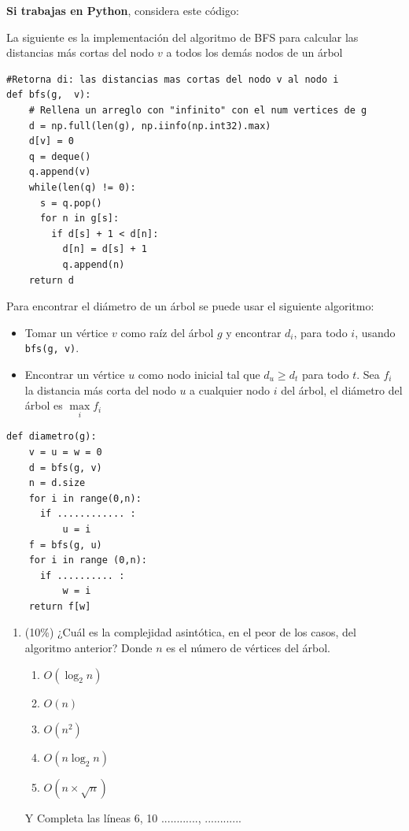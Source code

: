 \documentclass[10 pt]{article}
\begin{document}
\newpage



\textbf{Si trabajas en Python}, considera este código:

\hspace{1cm}

La siguiente es la implementación del algoritmo de BFS para calcular las
  distancias más cortas del nodo $v$ a todos los demás nodos de un árbol
  {\footnotesize
  \begin{lstlisting}
#Retorna di: las distancias mas cortas del nodo v al nodo i
def bfs(g,  v):
    # Rellena un arreglo con "infinito" con el num vertices de g
    d = np.full(len(g), np.iinfo(np.int32).max)
    d[v] = 0
    q = deque()
    q.append(v)
    while(len(q) != 0):
      s = q.pop()
      for n in g[s]:        
        if d[s] + 1 < d[n]:
          d[n] = d[s] + 1
          q.append(n)
    return d
  \end{lstlisting}
  }

  Para encontrar el diámetro de un árbol se puede usar el siguiente algoritmo:
  \begin{itemize}[noitemsep]
    \item Tomar un vértice $v$ como raíz del árbol $g$ y encontrar $d_i$, para todo $i$, usando \texttt{bfs(g, v)}.
    \item Encontrar un vértice $u$ como nodo inicial tal que $d_u \geq d_t$ para todo $t$. Sea $f_i$ la distancia más corta del nodo $u$ a cualquier nodo $i$ del árbol, el diámetro del árbol es $\max\limits_i{f_i}$
  \end{itemize}
  {\footnotesize
  \begin{lstlisting}
def diametro(g):
    v = u = w = 0
    d = bfs(g, v)
    n = d.size
    for i in range(0,n):
      if ............ :
          u = i
    f = bfs(g, u)
    for i in range (0,n):
      if .......... :
          w = i
    return f[w]
  \end{lstlisting}
  }
  \begin{enumerate}[label=(\Alph*)]
    \item (10\%) ¿Cuál es la complejidad asintótica, en el peor de los casos, del algoritmo anterior? Donde $n$ es el número de vértices del árbol.
    \begin{enumerate}[label=\roman*]
      \item $O(\log_2 n)$
      \item $O(n)$
      \item $O(n^2)$
      \item $O(n \log_2 n)$
      \item $O(n \times \sqrt{n})$
    \end{enumerate}
    Y Completa las líneas 6, 10 ............, ............
  \end{enumerate}
\end{document}
